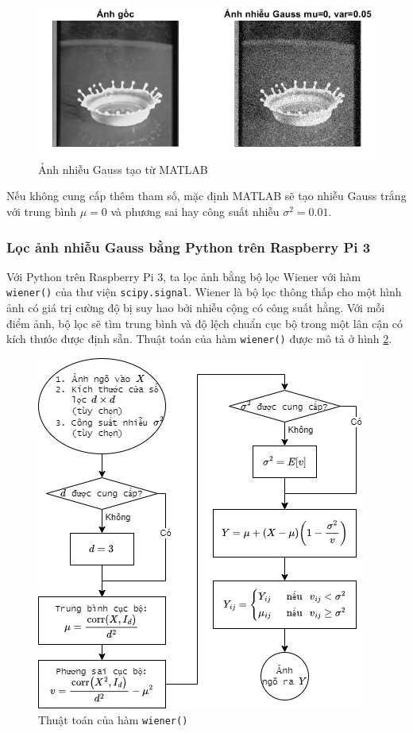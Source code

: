 \begin{figure}[H]
    \centering
    \includegraphics[width=.75\linewidth]{../images/gaussian_noise_matlab.png}
    \caption{Ảnh nhiễu Gauss tạo từ MATLAB}
    \label{fig:gaussian_noise_matlab}
\end{figure}

Nếu không cung cấp thêm tham số, mặc định MATLAB sẽ tạo nhiễu Gauss trắng với trung bình $\mu = 0$ và phương sai hay công suất nhiễu $\sigma^2 = 0.01$.

\subsubsection{Lọc ảnh nhiễu Gauss bằng Python trên Raspberry Pi 3}

Với Python trên Raspberry Pi 3, ta lọc ảnh bằng bộ lọc Wiener với hàm \texttt{wiener()} của thư viện \texttt{scipy.signal}. 
Wiener là bộ lọc thông thấp cho một hình ảnh có giá trị cường độ bị suy hao bởi nhiễu cộng có công suất hằng. 
Với mỗi điểm ảnh, bộ lọc sẽ tìm trung bình và độ lệch chuẩn cục bộ trong một lân cận có kích thước được định sẵn.
Thuật toán của hàm \texttt{wiener()} được mô tả ở hình \ref{fig:wiener_algorithm}.

\begin{figure}[H]
    \centering
    \includegraphics[width=.75\linewidth]{../images/wiener_algorithm.png}
    \caption{Thuật toán của hàm \texttt{wiener()}}
    \label{fig:wiener_algorithm}
\end{figure}

